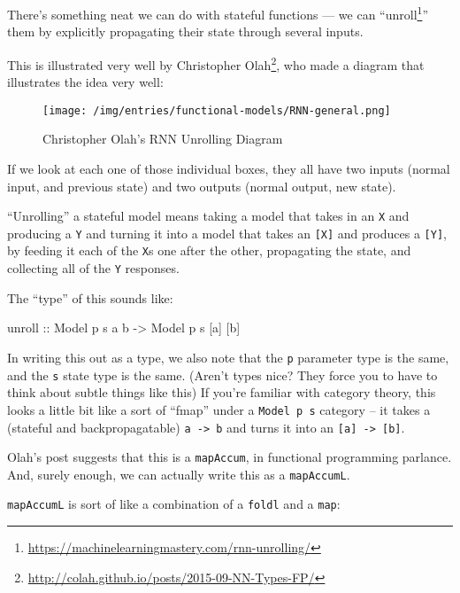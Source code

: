 \documentclass[]{article}
\newenvironment{Shaded}{}{}
\newcommand{\DataTypeTok}[1]{\textcolor[rgb]{0.56,0.13,0.00}{#1}}
\newcommand{\NormalTok}[1]{#1}
\newcommand{\OtherTok}[1]{\textcolor[rgb]{0.00,0.44,0.13}{#1}}
\renewcommand{\href}[2]{#2\footnote{\url{#1}}}
\begin{document}
There's something neat we can do with stateful functions --- we can
``\href{https://machinelearningmastery.com/rnn-unrolling/}{unroll}'' them by
explicitly propagating their state through several inputs.

This is illustrated very well by
\href{http://colah.github.io/posts/2015-09-NN-Types-FP/}{Christopher Olah}, who
made a diagram that illustrates the idea very well:

\begin{figure}
\centering
\texttt{[image: /img/entries/functional-models/RNN-general.png]}
\caption{Christopher Olah's RNN Unrolling Diagram}
\end{figure}

If we look at each one of those individual boxes, they all have two inputs
(normal input, and previous state) and two outputs (normal output, new state).

``Unrolling'' a stateful model means taking a model that takes in an \texttt{X}
and producing a \texttt{Y} and turning it into a model that takes an
\texttt{{[}X{]}} and produces a \texttt{{[}Y{]}}, by feeding it each of the
\texttt{X}s one after the other, propagating the state, and collecting all of
the \texttt{Y} responses.

The ``type'' of this sounds like:

\begin{Shaded}
\begin{Highlighting}[]
\OtherTok{unroll ::} \DataTypeTok{Model}\NormalTok{ p s a b }\OtherTok{->} \DataTypeTok{Model}\NormalTok{ p s [a] [b]}
\end{Highlighting}
\end{Shaded}

In writing this out as a type, we also note that the \texttt{p} parameter type
is the same, and the \texttt{s} state type is the same. (Aren't types nice? They
force you to have to think about subtle things like this) If you're familiar
with category theory, this looks a little bit like a sort of ``fmap'' under a
\texttt{Model\ p\ s} category -- it takes a (stateful and backpropagatable)
\texttt{a\ -\textgreater{}\ b} and turns it into an
\texttt{{[}a{]}\ -\textgreater{}\ {[}b{]}}.

Olah's post suggests that this is a \texttt{mapAccum}, in functional programming
parlance. And, surely enough, we can actually write this as a
\texttt{mapAccumL}.

\texttt{mapAccumL} is sort of like a combination of a \texttt{foldl} and a
\texttt{map}:
\end{document}
